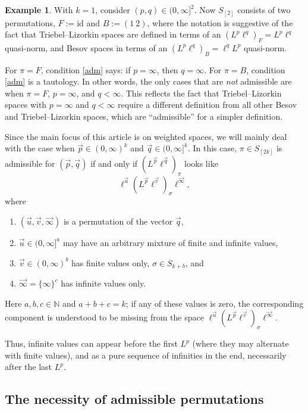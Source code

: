 \documentclass[11pt, reqno]{amsart}
\theoremstyle{definition}
\newtheorem{example}[theorem]{Example}
\theoremstyle{remark}
\numberwithin{equation}{section}
\newcommand{\N}{\mathbb N}
\newcommand{\vinfty}{\vec{\infty}}
\newcommand{\vp}{\vec p}
\newcommand{\vq}{\vec q}
\newcommand{\vu}{\vec u}
\newcommand{\vv}{\vec v}
\newcommand{\id}{\mathrm{id}}
\newcommand{\perm}[2]{(#1\ #2)}
\begin{document}
\begin{example}\label{ex adm}
With $k=1$, consider $(p,q)\in (0,\infty]^2$. Now $S_{[2]}$ consists of two permutations, $F:=\id$ and $B:=\perm{1}{2}$, where the notation is suggestive of the fact that Triebel--Lizorkin spaces are defined in terms of an $(L^p\ell^q)_F=L^p\ell^q$ quasi-norm, and Besov spaces in terms of an $(L^p\ell^q)_B=\ell^qL^p$ quasi-norm.

For $\pi=F$, condition \eqref{adm} says: if $p=\infty$, then $q=\infty$. For $\pi=B$, condition \eqref{adm} is a tautology. In other words, the only cases that are \emph{not} admissible are when $\pi=F$, $p=\infty$, and $q<\infty$. This reflects the fact that Triebel--Lizorkin spaces with $p=\infty$ and $q<\infty$ require a different definition from all other Besov and Triebel--Lizorkin spaces, which are ``admissible'' for a simpler definition.
\end{example}

Since the main focus of this article is on weighted spaces,
we will mainly deal with the case when $\vp\in(0,\infty)^k$ and $\vq\in(0,\infty]^k$. In this case, $\pi\in S_{[2k]}$ is admissible for $(\vp,\vq)$ if and only if $(L^{\vp}\ell^{\vq})_\pi$ looks like
\begin{equation*}
\ell^{\vu}(L^{\vp}\ell^{\vv})_\sigma\ell^{\vinfty},
\end{equation*}
where
\begin{enumerate}[\rm(i)]
\item
$(\vu,\vv,\vinfty)$ is a permutation of the vector $\vq$,

\item
$\vu\in(0,\infty]^a$ may have an arbitrary mixture of finite and infinite values,

\item
$\vv\in(0,\infty)^b$ has finite values only, $\sigma\in S_{k+b}$, and

\item
$\vinfty=\{\infty\}^c$ has infinite values only.
\end{enumerate}
Here $a,b,c\in\N$ and $a+b+c=k$; if any of these values is zero, the corresponding component is understood to be missing from the space $\ell^{\vu}(L^{\vp}\ell^{\vv})_\sigma\ell^{\vinfty}$.

Thus, infinite values can appear before the first $L^p$ (where they may alternate with finite values), and as a pure sequence of infinities in the end, necessarily after the last $L^p$.

\subsection{The necessity of admissible permutations}\label{sec:necpart}
\end{document}
